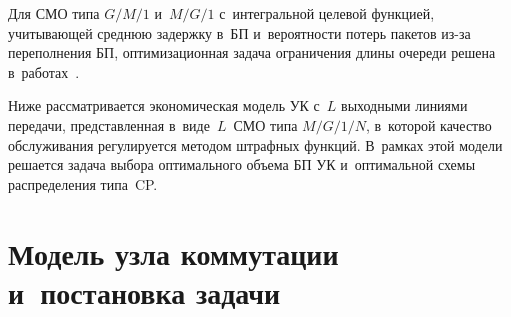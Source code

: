 \begin{multicols}{2}
 Для СМО типа 
$G/M/1$ и~$M/G/1$ с~интегральной целевой функцией, учитывающей среднюю 
задержку в~БП и~вероятности потерь пакетов из-за переполнения БП, 
оптимизационная задача ограничения длины очереди решена 
в~работах~\cite{11-ag, 12-ag, 13-ag}. 
  
  Ниже рассматривается экономическая модель УК с~$L$ выходными линиями 
передачи, пред\-став\-лен\-ная в~виде~$L$~СМО типа 
$M/G/1/N$, в~которой качество обслуживания регулируется методом штрафных 
функций. В~рамках этой модели решается задача выбора оптимального объема 
БП УК и~оптимальной схемы распределения типа~CP. 

\section{Модель узла коммутации и~постановка задачи} 
  

\end{multicols}
